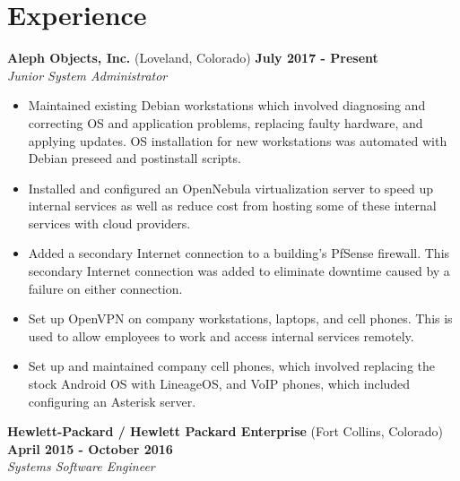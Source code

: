 \documentclass[letterpaper,10pt]{article}
\begin{document}
    \section*{Experience}
        \textbf{Aleph Objects, Inc.} (Loveland, Colorado) \hfill \textbf{July 2017 - Present} \\[1pt]
        \emph{Junior System Administrator}
        \begin{itemize}
            \item Maintained existing Debian workstations which involved diagnosing and correcting OS and application problems, replacing faulty hardware, and applying updates. OS installation for new workstations was automated with Debian preseed and postinstall scripts.
            \item Installed and configured an OpenNebula virtualization server to speed up internal services as well as reduce cost from hosting some of these internal services with cloud providers.
            \item Added a secondary Internet connection to a building's PfSense firewall. This secondary Internet connection was added to eliminate downtime caused by a failure on either connection.
            \item Set up OpenVPN on company workstations, laptops, and cell phones. This is used to allow employees to work and access internal services remotely.
            \item Set up and maintained company cell phones, which involved replacing the stock Android OS with LineageOS, and VoIP phones, which included configuring an Asterisk server.
        \end{itemize}
        \vspace*{2ex}
        \textbf{Hewlett-Packard / Hewlett Packard Enterprise} (Fort Collins, Colorado) \hfill \textbf{April 2015 - October 2016} \\[1pt]
        \emph{Systems Software Engineer}
\end{document}
